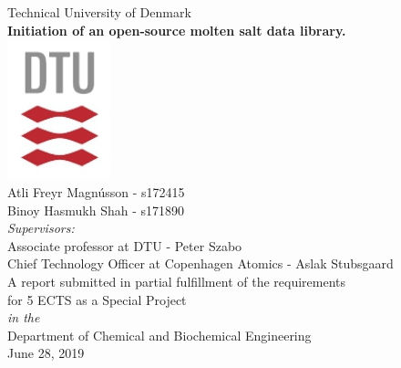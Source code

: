 \documentclass[11pt,oneside]{article}
\begin{document}


\begin{titlepage}



\begin{center}
{\LARGE Technical University of Denmark}\\[1cm]
\linespread{1.2}\huge {\bfseries Initiation of an open-source molten salt data library.}\\[1cm]
\linespread{1}
\includegraphics[width=3cm]{images/dtulogo.PNG}\\[1cm]
{\Large Atli Freyr Magnússon - s172415 \\
Binoy Hasmukh Shah - s171890}\\[1cm]
{\large \emph{Supervisors:\\} 
Associate professor at DTU - Peter Szabo\\
Chief Technology Officer at Copenhagen Atomics - Aslak Stubsgaard}\\[1.25cm] %
\large A report submitted in partial fulfillment of the requirements\\ for 5 ECTS as a Special Project\\[0.3cm] 
\textit{in the}\\[0.3cm]
Department of Chemical and Biochemical Engineering
\\[2cm]
June 28, 2019
\end{center}

\end{titlepage}


\end{document}
